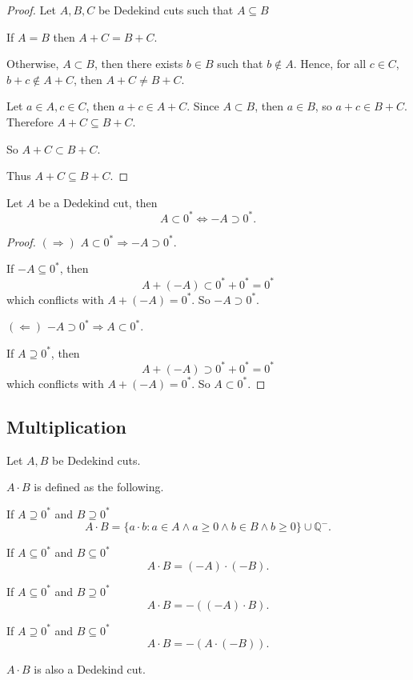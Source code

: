 \begin{proof}
    Let $A, B, C$ be Dedekind cuts such that $A\subseteq B$

    If $A = B$ then $A + C = B + C$.

    Otherwise, $A\subset B$, then there exists $b\in B$ such that $b\notin A$. Hence, for all $c\in C$, $b + c\notin A + C$, then $A + C\ne B + C$.

    Let $a\in A, c\in C$, then $a + c\in A + C$. Since $A\subset B$, then $a\in B$, so $a + c\in B + C$. Therefore $A + C\subseteq B + C$.

    So $A + C\subset B + C$.

    Thus $A + C\subseteq B + C$.
\end{proof}

\begin{theorem}
    \par Let $A$ be a Dedekind cut, then
    \[
        A\subset {0}^{*} \Longleftrightarrow -A\supset {0}^{*}.
    \]
\end{theorem}

\begin{proof}
    $(\Rightarrow)$ $A\subset {0}^{*}\Longrightarrow -A\supset {0}^{*}$.

    If $-A\subseteq {0}^{*}$, then
    \[
        A + (-A) \subset {0}^{*} + {0}^{*} = {0}^{*}
    \]
    which conflicts with $A + (-A) = {0}^{*}$. So $-A\supset {0}^{*}$.

    $(\Leftarrow)$ $-A\supset {0}^{*}\Longrightarrow A\subset {0}^{*}$.

    If $A\supseteq {0}^{*}$, then
    \[
        A + (-A) \supset {0}^{*} + {0}^{*} = {0}^{*}
    \]
    which conflicts with $A + (-A) = {0}^{*}$. So $A\subset {0}^{*}$.
\end{proof}

\subsection{Multiplication}

\begin{theorem}[Multiplication]
    \par Let $A, B$ be Dedekind cuts.
    \par $A\cdot B$ is defined as the following.
    \par If $A\supseteq{0}^{*}$ and $B\supseteq{0}^{*}$
    \[
        A\cdot B = \{ a\cdot b : a\in A\wedge a\ge 0 \wedge b\in B\wedge b\ge 0 \} \cup \mathbb{Q}^{-}.
    \]
    \par If $A\subseteq{0}^{*}$ and $B\subseteq{0}^{*}$
    \[
        A\cdot B = (-A)\cdot (-B).
    \]
    \par If $A\subseteq{0}^{*}$ and $B\supseteq{0}^{*}$
    \[
        A\cdot B = -\left((-A)\cdot B\right).
    \]
    \par If $A\supseteq{0}^{*}$ and $B\subseteq{0}^{*}$
    \[
        A\cdot B = -\left(A\cdot (-B)\right).
    \]
    \par $A\cdot B$ is also a Dedekind cut.
\end{theorem}

